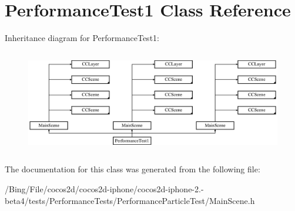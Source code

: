 \hypertarget{interface_performance_test1}{\section{Performance\-Test1 Class Reference}
\label{interface_performance_test1}
}
Inheritance diagram for Performance\-Test1\-:\begin{figure}[H]
\begin{center}
\leavevmode
\includegraphics[height=4.552845cm]{interface_performance_test1}
\end{center}
\end{figure}


The documentation for this class was generated from the following file\-:\begin{DoxyCompactItemize}
\item 
/\-Bing/\-File/cocos2d/cocos2d-\/iphone/cocos2d-\/iphone-\/2.-\/beta4/tests/\-Performance\-Tests/\-Performance\-Particle\-Test/Main\-Scene.\-h\end{DoxyCompactItemize}
